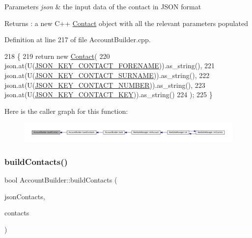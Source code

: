 \begin{DoxyParams}{Parameters}
{\em json} & the input data of the contact in J\+S\+ON format \\
\hline
\end{DoxyParams}
\begin{DoxyReturn}{Returns}
\+: a new C++ \hyperlink{class_contact}{Contact} object with all the relevant parameters populated 
\end{DoxyReturn}


Definition at line 217 of file Account\+Builder.\+cpp.


\begin{DoxyCode}
218 \{
219     \textcolor{keywordflow}{return} \textcolor{keyword}{new} \hyperlink{class_contact}{Contact}(
220             json.at(U(\hyperlink{_contact_8h_a18b1ad44af79fea17bfed22ff66f94f8}{JSON\_KEY\_CONTACT\_FORENAME})).as\_string(),
221             json.at(U(\hyperlink{_contact_8h_a579318fe639c3cf3628817c4090be13e}{JSON\_KEY\_CONTACT\_SURNAME})).as\_string(),
222             json.at(U(\hyperlink{_contact_8h_a97dc3d327e5283642c81bc7d6a572ced}{JSON\_KEY\_CONTACT\_NUMBER})).as\_string(),
223             json.at(U(\hyperlink{_contact_8h_a90f2095b835454d47c72995503684937}{JSON\_KEY\_CONTACT\_KEY})).as\_string()
224     );
225 \}
\end{DoxyCode}
Here is the caller graph for this function\+:\nopagebreak
\begin{figure}[H]
\begin{center}
\leavevmode
\includegraphics[width=350pt]{d9/daa/class_account_builder_a3a3cc8d8beb8af6c0a9feb79e28adb59_icgraph}
\end{center}
\end{figure}
\mbox{\label{class_account_builder_aa3af3cf2501508d76ee3f7140deeba80}} 
\subsubsection{\texorpdfstring{build\+Contacts()}{buildContacts()}}
{\footnotesize\ttfamily bool Account\+Builder\+::build\+Contacts (\begin{DoxyParamCaption}\item[{const web\+::json\+::array \&}]{json\+Contacts,  }\item[{std\+::vector$<$ \hyperlink{class_contact}{Contact} $\ast$$>$ \&}]{contacts }\end{DoxyParamCaption})\hspace{0.3cm}{\ttfamily [private]}}

